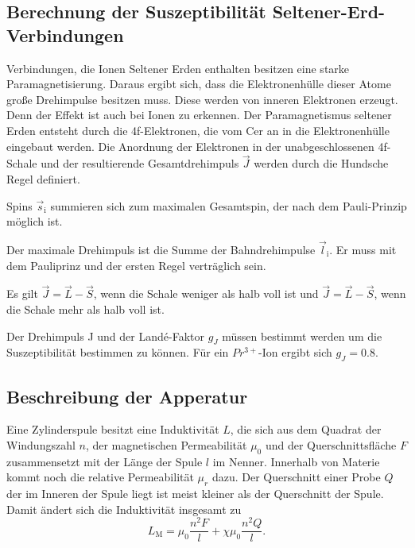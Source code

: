 \subsection{Berechnung der Suszeptibilität Seltener-Erd-Verbindungen}

Verbindungen, die Ionen Seltener Erden enthalten besitzen eine starke Paramagnetisierung. Daraus ergibt sich, dass die Elektronenhülle dieser Atome große Drehimpulse besitzen muss. 
Diese werden von inneren Elektronen erzeugt. Denn der Effekt ist auch bei Ionen zu erkennen. Der Paramagnetismus seltener Erden entsteht durch die 4f-Elektronen, die vom Cer an in die Elektronenhülle eingebaut werden. Die Anordnung der Elektronen in der unabgeschlossenen 4f-Schale und der resultierende Gesamtdrehimpuls $\vec{J}$ werden durch die Hundsche Regel definiert. 
\begin{enumeration}
\item Spins $\vec{s}_\text{i}$ summieren sich zum maximalen Gesamtspin, der nach dem Pauli-Prinzip möglich ist. 
\item Der maximale Drehimpuls ist die Summe der Bahndrehimpulse $\vec{l}_\text{i}$. Er muss mit dem Pauliprinz und der ersten Regel verträglich sein. 
\item Es gilt $\vec{J}= \vec{L}-\vec{S}$, wenn die Schale weniger als halb voll ist und $\vec{J}= \vec{L}-\vec{S}$, wenn die Schale mehr als halb voll ist.
\end{enumeration}

Der Drehimpuls J und der Landé-Faktor $g_J$ müssen bestimmt werden um die Suszeptibilität bestimmen zu können. Für ein $Pr^{3+}$-Ion ergibt sich $g_J= 0.8$.

\subsection{Beschreibung der Apperatur}

Eine Zylinderspule besitzt eine Induktivität $L$, die sich aus dem Quadrat der Windungszahl $n$, der magnetischen Permeabilität $\mu_0$ und der Querschnittsfläche $F$ zusammensetzt mit der Länge der Spule $l$ im Nenner. Innerhalb von Materie kommt noch die relative Permeabilität $\mu_r$ dazu. Der Querschnitt einer Probe $Q$ der im Inneren der Spule liegt ist meist kleiner als der Querschnitt der Spule.
Damit ändert sich die Induktivität insgesamt zu 
\begin{equation}
    L_\text{M}= \mu_0 \frac{n^2 F}{l} + \chi \mu_0 \frac{n^2 Q}{l}.
    \label{eqn:induktivität}
\end{equation}

